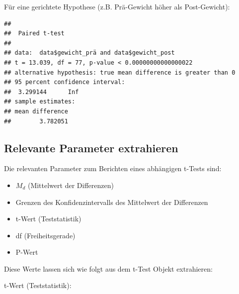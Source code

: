 \documentclass[
]{book}
\newenvironment{Shaded}{\begin{snugshade}}{\end{snugshade}}
\newcommand{\AttributeTok}[1]{\textcolor[rgb]{0.13,0.29,0.53}{#1}}
\newcommand{\FunctionTok}[1]{\textcolor[rgb]{0.13,0.29,0.53}{\textbf{#1}}}
\newcommand{\NormalTok}[1]{#1}
\newcommand{\SpecialCharTok}[1]{\textcolor[rgb]{0.81,0.36,0.00}{\textbf{#1}}}
\newcommand{\StringTok}[1]{\textcolor[rgb]{0.31,0.60,0.02}{#1}}
\providecommand{\tightlist}{%
  \setlength{\itemsep}{0pt}\setlength{\parskip}{0pt}}
\begin{document}
Für eine gerichtete Hypothese (z.B. Prä-Gewicht höher als Post-Gewicht):

\begin{Shaded}
\end{Shaded}

\begin{verbatim}
## 
##  Paired t-test
## 
## data:  data$gewicht_prä and data$gewicht_post
## t = 13.039, df = 77, p-value < 0.00000000000000022
## alternative hypothesis: true mean difference is greater than 0
## 95 percent confidence interval:
##  3.299144      Inf
## sample estimates:
## mean difference 
##        3.782051
\end{verbatim}

\subsection{Relevante Parameter extrahieren}\label{relevante-parameter-extrahieren-1}

Die relevanten Parameter zum Berichten eines abhängigen t-Tests sind:

\begin{itemize}
\tightlist
\item
  \(M_d\) (Mittelwert der Differenzen)
\item
  Grenzen des Konfidenzintervalls des Mittelwert der Differenzen
\item
  t-Wert (Teststatistik)
\item
  df (Freiheitsgerade)
\item
  P-Wert
\end{itemize}

Diese Werte lassen sich wie folgt aus dem t-Test Objekt extrahieren:

t-Wert (Teststatistik):

\begin{Shaded}
\end{Shaded}
\end{document}
